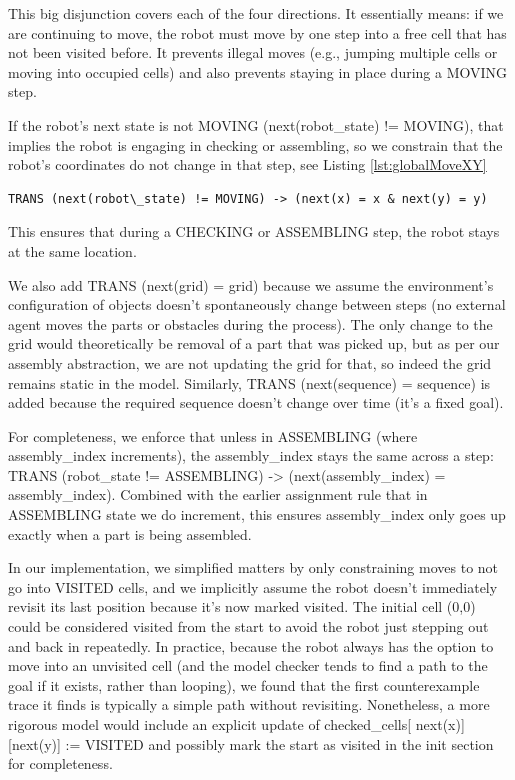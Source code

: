  This big disjunction covers each of the four directions. 
 It essentially means: if we are continuing to move, the robot must move 
 by one step into a free cell that has not been visited before. 
It prevents illegal moves (e.g., jumping multiple cells or moving into occupied cells) and also 
 prevents staying in place during a MOVING step.

If the robot's next state is not MOVING (next(robot\_state) != MOVING), 
that implies the robot is engaging in checking or assembling, so we 
constrain that the robot’s coordinates do not change in that step, see Listing \ref{lst:globalMoveXY}

\begin{lstlisting}[language=NuSMV, caption={Condition that robot position doesnt change if not MOVING}, 
    label={lst:globalMoveXY}]
    TRANS (next(robot\_state) != MOVING) -> (next(x) = x & next(y) = y)
\end{lstlisting}

This ensures that during a CHECKING or ASSEMBLING step, the robot stays at the same 
location.

We also add TRANS (next(grid) = grid) because we assume the environment's
configuration of objects doesn't spontaneously change between steps 
(no external agent moves the parts or obstacles during the process). 
The only change to the grid would theoretically 
be removal of a part that was picked up, but as per our assembly abstraction,
we are not updating the grid for that, so indeed the grid remains static 
in the model. Similarly, TRANS (next(sequence) = sequence) is added because 
the required sequence doesn’t change over time (it's a fixed goal).


For completeness, we enforce that unless in ASSEMBLING (where assembly\_index increments),
the assembly\_index stays the same across a step: 
TRANS (robot\_state != ASSEMBLING) -> (next(assembly\_index) = assembly\_index). 
Combined with the earlier assignment rule that in ASSEMBLING state we do increment, 
this ensures assembly\_index only goes up exactly when a part is being 
assembled.

In our implementation, we simplified matters by 
only constraining moves to not go into VISITED cells, and we implicitly assume 
the robot doesn't immediately revisit its last position because it's now marked visited.
The initial cell (0,0) could be considered visited 
from the start to avoid the robot just stepping out and back in repeatedly.
In practice, because the robot always has the option to move into an 
unvisited cell (and the model checker tends to find a path to the goal 
if it exists, rather than looping), we found that the first counterexample trace 
it finds is typically a simple path without revisiting. 
Nonetheless, a more rigorous model would include an explicit update of checked\_cells[
next(x)][next(y)] := VISITED and possibly mark the start as visited in 
the init section for completeness.


